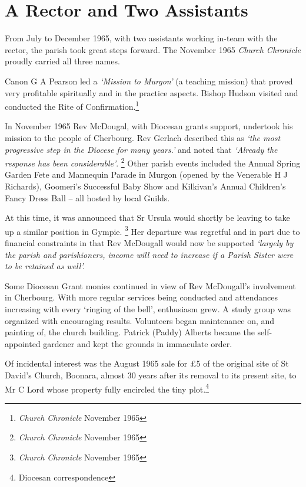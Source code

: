 \section{A Rector and Two Assistants}



From July to December 1965, with two assistants working in-team with the rector, the parish took great steps forward. The November 1965 \emph{Church Chronicle} proudly carried all three names.



Canon G A Pearson led a \emph{`Mission to Murgon'} (a teaching mission) that proved very profitable spiritually and in the practice aspects. Bishop Hudson visited and conducted the Rite of Confirmation.\footnote{\emph{Church Chronicle} November 1965}


In November 1965 Rev McDougal, with Diocesan grants support, undertook his mission to the people of Cherbourg. Rev Gerlach described this as \emph{`the most progressive step in the Diocese for many years.'} and noted that \emph{`Already the response has been considerable'}. \footnote{\emph{Church Chronicle} November 1965} Other parish events included the Annual Spring Garden Fete and Mannequin Parade in Murgon (opened by the Venerable H J Richards), Goomeri's Successful Baby Show and Kilkivan's Annual Children's Fancy Dress Ball -- all hosted by local Guilds.


At this time, it was announced that Sr Ursula would shortly be leaving to take up a similar position in Gympie. \footnote{\emph{Church Chronicle} November 1965} Her departure was regretful and in part due to financial constraints in that Rev McDougall would now be supported \emph{`largely by the parish and parishioners, income will need to increase if a Parish Sister were to be retained as well'.}


Some Diocesan Grant monies continued in view of Rev McDougall's involvement in Cherbourg. With more regular services being conducted and attendances increasing with every `ringing of the bell', enthusiasm grew. A study group was organized with encouraging results. Volunteers began maintenance on, and painting of, the church building. Patrick (Paddy) Alberts became the self-appointed gardener and kept the grounds in immaculate order.



Of incidental interest was the August 1965 sale for \pounds5 of the original site of St David's Church, Boonara, almost 30 years after its removal to its present site, to Mr C Lord whose property fully encircled the tiny plot.\footnote{Diocesan correspondence}


